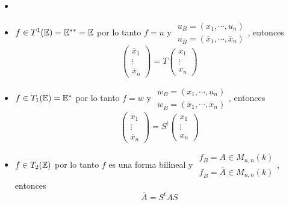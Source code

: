 \hfill
\begin{example}
    \begin{itemize}
                \item []
        \item $f \in T^1(\mathbb{E}) = \mathbb{E}^{**} = \mathbb{E}$ por lo tanto $f = u$ y $\substack{
        u_B = (x_1, \cdots, u_n) \\ u_{\overline{B}} = (\overline{x}_1, \cdots,
        \overline{x}_n)}$, entonces
        \[
            \begin{pmatrix}
                \overline{x}_1 \\
                \vdots \\
                \overline{x}_n
            \end{pmatrix}
            = T \begin{pmatrix}
                x_1 \\
                \vdots \\
                x_n
            \end{pmatrix}
        \]
        \item $f \in T_1(\mathbb{E}) = \mathbb{E}^*$ por lo tanto $f = w$ y $\substack{
        w_B = (x_1, \cdots, u_n) \\ w_{\overline{B}} = (\overline{x}_1, \cdots,
        \overline{x}_n)}$, entonces
        \[
            \begin{pmatrix}
                \overline{x}_1 \\
                \vdots \\
                \overline{x}_n
            \end{pmatrix}
                = S^t \begin{pmatrix}
                x_1 \\
                \vdots \\
                x_n
            \end{pmatrix}
        \]
        \item $f \in T_2(\mathbb{E})$ por lo tanto $f$ es una forma bilineal y $\substack{
        f_B = A \in M_{n,n}(k) \\ f_{\overline{B}} = \overline{A} \in M_{n,n}(k)}$,
        entonces
        \[
            \overline{A} = S^tAS
        \]
    \end{itemize}
\end{example}



